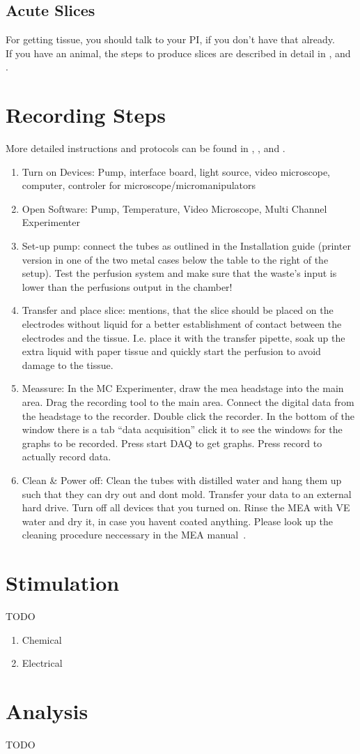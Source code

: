 \documentclass[11pt]{article}
\begin{document}
    \subsection{Acute Slices}
        For getting tissue, you should talk to your PI, if you don't have that already. \\
        If you have an animal, the steps to produce slices are described in detail in \cite[p. 10]{star}, \cite[p. 122]{dallas2021patch} and \cite{mcs}.

\section{Recording Steps}
    More detailed instructions and protocols can be found in \cite[p. 10]{star}, \cite[p. 122]{dallas2021patch}, \cite{axion} and \cite{mcs}.
    \begin{enumerate}
     \item Turn on Devices: Pump, interface board, light source, video microscope, computer, controler for microscope/micromanipulators
     \item Open Software: Pump, Temperature, Video Microscope, Multi Channel Experimenter
     \item Set-up pump: connect the tubes as outlined in the Installation guide (printer version in one of the two metal cases below the table to the right of the setup). Test the perfusion system and make sure that the waste's input is lower than the perfusions output in the chamber!
     \item Transfer and place slice: \cite{mcs} mentions, that the slice should be placed on the electrodes without liquid for a better establishment of contact between the electrodes and the tissue. I.e. place it with the transfer pipette, soak up the extra liquid with paper tissue and quickly start the perfusion to avoid damage to the tissue.
     \item Meassure: In the MC Experimenter, draw the mea headstage into the main area. Drag the recording tool to the main area. Connect the digital data from the headstage to the recorder. Double click the recorder. In the bottom of the window there is a tab ``data acquisition'' click it to see the windows for the graphs to be recorded. Press start DAQ to get graphs. Press record to actually record data.
     \item Clean \& Power off: Clean the tubes with distilled water and hang them up such that they can dry out and dont mold. Transfer your data to an external hard drive. Turn off all devices that you turned on. Rinse the MEA with VE water and dry it, in case you havent coated anything. Please look up the cleaning procedure neccessary in the MEA manual~\cite{mea-man}.
    \end{enumerate}

\section{Stimulation}
TODO
    \begin{enumerate}
     \item Chemical
     \item Electrical
    \end{enumerate}

\section{Analysis}
TODO



\newpage
\printbibliography
\end{document}
